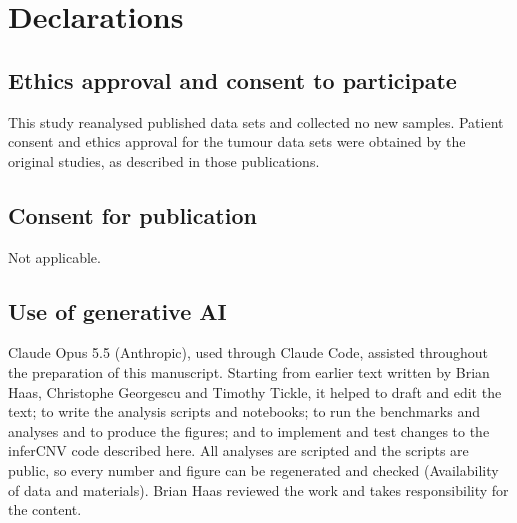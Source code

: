 \section*{Declarations}\label{sec:declarations}

\subsection*{Ethics approval and consent to participate}

This study reanalysed published data sets and collected no new samples. Patient consent and ethics approval for the tumour data sets were obtained by the original studies, as described in those publications.

\subsection*{Consent for publication}

Not applicable.

\subsection*{Use of generative AI}

Claude Opus 5.5 (Anthropic), used through Claude Code, assisted throughout the preparation of this manuscript. Starting from earlier text written by Brian Haas, Christophe Georgescu and Timothy Tickle, it helped to draft and edit the text; to write the analysis scripts and notebooks; to run the benchmarks and analyses and to produce the figures; and to implement and test changes to the inferCNV code described here. All analyses are scripted and the scripts are public, so every number and figure can be regenerated and checked (Availability of data and materials). Brian Haas reviewed the work and takes responsibility for the content.


